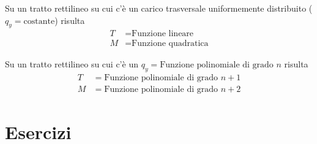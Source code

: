\begin{prop}
Su un tratto rettilineo su cui c'è un carico trasversale uniformemente distribuito ($q_{y} = \text{costante}$) risulta 
\begin{align*}
T &= \text{Funzione lineare} \\ 
M &= \text{Funzione quadratica}
\end{align*}
\end{prop}
\begin{prop}
Su un tratto rettilineo su cui c'è un $q_{y} = \text{Funzione polinomiale di grado } n$ risulta 
\begin{align*}
T &= \text{Funzione polinomiale di grado } n+1 \\ 
M &= \text{Funzione polinomiale di grado } n+2
\end{align*}
\end{prop}
\clearpage
\section{Esercizi}
